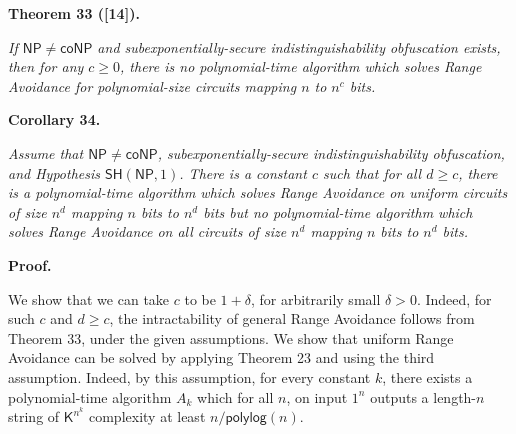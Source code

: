 

\par\medskip\noindent\textbf{
\textbf{Theorem 33}\textbf{ }([14])\textbf{.}
}\par



\emph{If ${\mathsf{NP}}\neq{\mathsf{coNP}}$ and subexponentially-secure indistinguishability obfuscation exists, then for any $c\geq 0$, there is no polynomial-time algorithm which solves Range Avoidance for polynomial-size circuits mapping $n$ to $n^{c}$ bits.}\par







\par\medskip\noindent\textbf{
\textbf{Corollary 34}\textbf{.}
}\par



\emph{Assume that ${\mathsf{NP}}\neq{\mathsf{coNP}}$, subexponentially-secure indistinguishability obfuscation, and Hypothesis $\mathsf{SH}({\mathsf{NP}},1)$. There is a constant $c$ such that for all $d\geq c$, there is a polynomial-time algorithm which solves Range Avoidance on uniform circuits of size $n^{d}$ mapping $n$ bits to $n^{d}$ bits but no polynomial-time algorithm which solves Range Avoidance on all circuits of size $n^{d}$ mapping $n$ bits to $n^{d}$ bits.}\par






\par\medskip\noindent\textbf{Proof.}\par




We show that we can take $c$ to be $1+\delta$, for arbitrarily small $\delta>0$. Indeed, for such $c$ and $d\geq c$, the intractability of general Range Avoidance follows from Theorem 33, under the given assumptions. We show that uniform Range Avoidance can be solved by applying Theorem 23 and using the third assumption. Indeed, by this assumption, for every constant $k$, there exists a polynomial-time algorithm $A_{k}$ which for all $n$, on input $1^{n}$ outputs a length-$n$ string of ${\mathsf{K}}^{n^{k}}$ complexity at least $n/{\mathsf{polylog}}(n)$.\par




